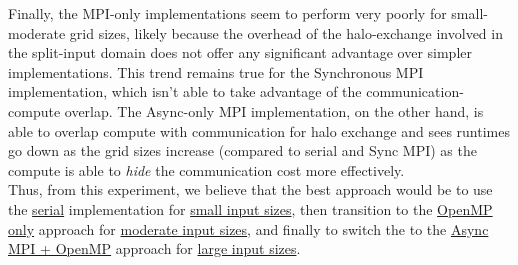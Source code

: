 \documentclass[a4paper,10pt]{article}
\begin{document}
Finally, the MPI-only implementations seem to perform very poorly for small-moderate grid sizes, likely because the overhead of the halo-exchange involved in the split-input domain does not offer any significant advantage over simpler implementations. This trend remains true for the Synchronous MPI implementation, which isn't able to take advantage of the communication-compute overlap. The Async-only MPI implementation, on the other hand, is able to overlap compute with communication for halo exchange and sees runtimes go down as the grid sizes increase (compared to serial and Sync MPI) as the compute is able to \textit{hide} the communication cost more effectively. \\

Thus, from this experiment, we believe that the best approach would be to use the \underline{serial} implementation for \underline{small input sizes}, then transition to the \underline{OpenMP only} approach for \underline{moderate input sizes}, and finally to switch the to the \underline{Async MPI + OpenMP} approach for \underline{large input sizes}. 
\end{document}

